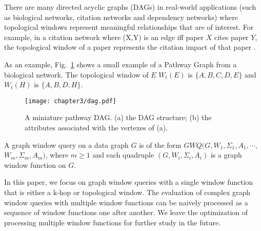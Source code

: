 There are many directed acyclic graphs (DAGs) in real-world applications (such as biological networks, citation networks and dependency networks)
where topological windows represent meaningful relationships that are of interest.
For example, in a citation network where (X,Y) is an edge  iff paper $X$ cites paper $Y$, 
the topological window of a paper represents the citation impact of that paper \cite{campanario2011empirical,holsapple2003citation,ma2008bringing}.

As an example, Fig.~\ref{fig:topological} shows a small example of a Pathway Graph from a biological network. 
The topological window of $E$ $W_t(E)$ is $\{A, B, C, D, E\}$ and $W_t(H)$ is $\{A, B, D, H\}$.


\begin{figure}[h]
\centering
 \texttt{[image: chapter3/dag.pdf]}
	\caption{A miniature pathway DAG. (a) the DAG structure; (b) the attributes associated with the vertexes of (a).}
	\label{fig:topological}
\end{figure}

\begin{definition} 
A graph window query on a data graph $G$ is of the form
$GWQ(G, W_1, \Sigma_1, A_1,\cdots,$ \\
$W_m, \Sigma_m, A_m)$, where $m \geq 1$
and
each quadruple $(G, W_i,\Sigma_i,A_i)$ is a graph window function on $G$.
\end{definition}
In this paper, we focus on graph window queries with a single window 
function that is either a k-hop or topological window. 
The evaluation of complex graph window queries with multiple window 
functions can be naively processed as a sequence of window functions one
after another. We leave the optimization of processing multiple
window functions for further study in the future.

